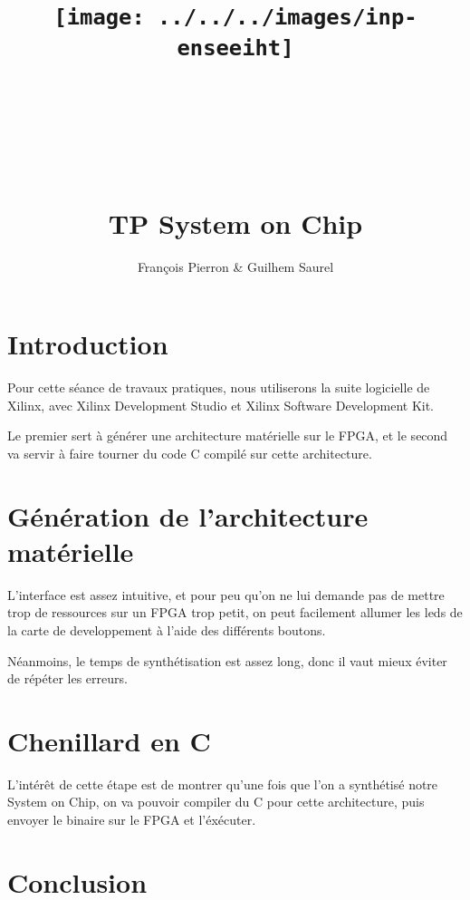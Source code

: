 \documentclass{article}
\title{\texttt{[image: ../../../images/inp-enseeiht]} \\ ~ \\ ~ \\ ~ \\ ~ \\ TP System on Chip}
\author{François Pierron \& Guilhem Saurel}
\date{\oldstylenums{\today}}
\begin{document}
\begin{titlepage}
    \setcounter{page}{0}
    \maketitle
    \vfill
    \tableofcontents
    \thispagestyle{empty}
\end{titlepage}

\section*{Introduction}

Pour cette séance de travaux pratiques, nous utiliserons la suite logicielle de Xilinx, avec Xilinx Development Studio et Xilinx Software Development Kit.

Le premier sert à générer une architecture matérielle sur le FPGA, et le second va servir à faire tourner du code C compilé sur cette architecture.

\section{Génération de l’architecture matérielle}

L’interface est assez intuitive, et pour peu qu’on ne lui demande pas de mettre trop de ressources sur un FPGA trop petit, on peut facilement allumer les leds de la carte de developpement à l’aide des différents boutons.

Néanmoins, le temps de synthétisation est assez long, donc il vaut mieux éviter de répéter les erreurs.

\section{Chenillard en C}

L’intérêt de cette étape est de montrer qu’une fois que l’on a synthétisé notre System on Chip, on va pouvoir compiler du C pour cette architecture, puis envoyer le binaire sur le FPGA et l’éxécuter.

\section*{Conclusion}
\end{document}
